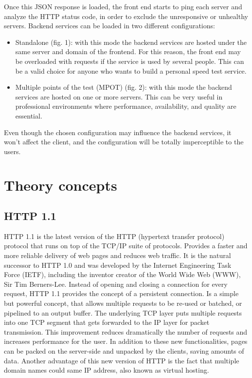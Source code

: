 \documentclass{article}
\begin{document}
Once this JSON response is loaded, the front end starts to ping each server and analyze the HTTP status code, in order to exclude the unresponsive or unhealthy servers.
Backend services can be loaded in two different configurations:
\begin{itemize}
\item Standalone (fig. 1): with this mode the backend services are hosted under the same server and domain of the frontend. For this reason, the front end may be overloaded with requests if the service is used by several people. This can be a valid choice for anyone who wants to build a personal speed test service.
\item Multiple points of the test (MPOT) (fig. 2): with this mode the backend services are hosted on one or more servers. This can be very useful in professional environments where performance, availability, and quality are essential.
\end{itemize}

Even though the chosen configuration may influence the backend services, it won’t affect the client, and the configuration will be totally imperceptible to the users.

\newpage
\section{Theory concepts}
\subsection{HTTP 1.1}
HTTP 1.1 is the latest version of the HTTP (hypertext transfer protocol) protocol that runs on top of the TCP/IP suite of protocols. Provides a faster and more reliable delivery of web pages and reduces web traffic. It is the natural successor to HTTP 1.0 and was developed by the Internet Engineering Task Force (IETF), including the inventor creator of the World Wide Web (WWW), Sir Tim Berners-Lee.
Instead of opening and closing a connection for every request, HTTP 1.1 provides the concept of a persistent connection. Is a simple but powerful concept, that allows multiple requests to be re-used or batched, or pipelined to an output buffer. The underlying TCP layer puts multiple requests into one TCP segment that gets forwarded to the IP layer for packet transmission. This improvement reduces dramatically the number of requests and increases performance for the user. In addition to these new functionalities, pages can be packed on the server-side and unpacked by the clients, saving amounts of data.
Another advantage of this new version of HTTP is the fact that multiple domain names could same IP address, also known as virtual hosting.
\end{document}
